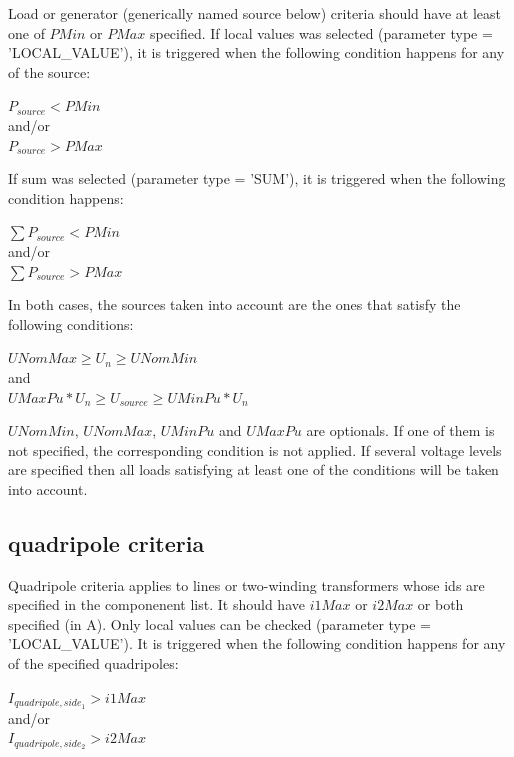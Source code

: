 \documentclass[a4paper, 12pt]{report}
\begin{document}
Load or generator (generically named source below) criteria should have at least
one of $PMin$ or $PMax$ specified.
If local values was selected  (parameter type = 'LOCAL\_VALUE'), it is triggered when
the following condition happens for any of the source:\\
\begin{center}
$P_{source} < PMin$\\
and/or\\
$P_{source} > PMax$\\
\end{center}
If sum was selected  (parameter type = 'SUM'), it is triggered when the
following condition happens: \\
\begin{center}
$\sum P_{source} < PMin$\\
and/or\\
$\sum P_{source} > PMax$ \\
\end{center}
In both cases, the sources taken into account are the ones that satisfy the
following conditions:\\
\begin{center}
$UNomMax \ge U_n \ge UNomMin$\\
and\\
$UMaxPu*U_n \ge U_{source} \ge UMinPu*U_n$ \\
\end{center}

$UNomMin$, $UNomMax$, $UMinPu$ and $UMaxPu$ are optionals. If one of them is not
specified, the corresponding condition is not applied.
If several voltage levels are specified then all loads satisfying at least one of the conditions will be taken into account.

\subsection{quadripole criteria}

Quadripole criteria applies to lines or two-winding transformers whose
ids are specified in the componenent list. It
should have $i1Max$ or $i2Max$ or both specified (in A). Only
local values can be checked (parameter type = 'LOCAL\_VALUE').
It is triggered when the following condition happens for any of the specified
quadripoles: \\
\begin{center}
$I_{quadripole,side_1} > i1Max$\\
and/or\\
$I_{quadripole,side_2} > i2Max$\\
\end{center}
\end{document}
